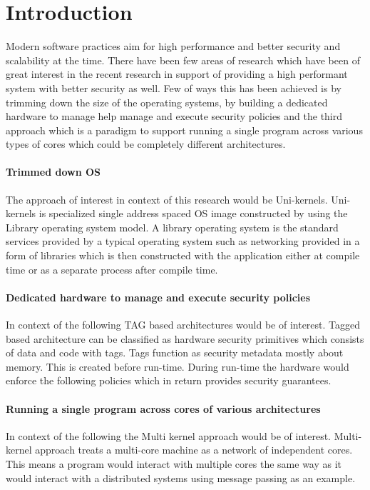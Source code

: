 
\chapter{Introduction}  %
Modern software practices aim for high performance and better security
and scalability at the time. There have been few areas of research 
which have been of great interest in the recent research in support 
of providing a high performant system with better security as well.
Few of ways this has been achieved is by trimming down the size of 
the operating systems, by building a dedicated hardware to manage 
help manage and execute security policies and the third approach 
which is a paradigm to support running a single program across 
various types of cores which could be completely different 
architectures.

\subsubsection{Trimmed down OS}
The approach of interest in context of this research would 
be Uni-kernels. Uni-kernels is specialized single address 
spaced OS image constructed by using the Library operating 
system model. A library operating system is the standard services 
provided by a typical operating system such as networking provided 
in a form of libraries which is then constructed with the application 
either at compile time or as a separate process after compile time.

\subsubsection{Dedicated hardware to manage and execute security
policies}
In context of the following TAG based architectures would be 
of interest. Tagged based architecture can be classified as 
hardware security primitives which consists of data and code with tags. 
Tags function as security metadata mostly about memory. This is
created before run-time. During run-time the hardware 
would enforce the following policies which in return 
provides security guarantees. 

\subsubsection{Running a single program across cores of 
various architectures}
In context of the following the Multi kernel approach would 
be of interest. Multi-kernel approach treats a multi-core machine 
as a network of independent cores. This means a program would interact
with multiple cores the same way as it would interact with a distributed systems 
using message passing as an example. 

